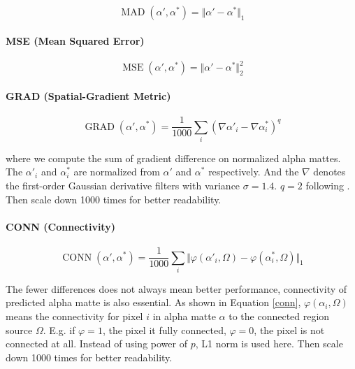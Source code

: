 \documentclass[final]{cvpr}
\begin{document}
\begin{equation}\label{mad}
    \operatorname{MAD}(\alpha', \alpha^*)=\Vert\alpha'-\alpha^*\Vert_1
\end{equation}

\paragraph{MSE (Mean Squared Error)}

\begin{equation}\label{mse}
    \operatorname{MSE}(\alpha', \alpha^*)=\Vert\alpha'-\alpha^*\Vert_2^2
\end{equation}

\paragraph{GRAD (Spatial-Gradient Metric)}

\begin{equation}\label{grad}
    \operatorname{GRAD}(\alpha', \alpha^*)=\frac{1}{1000}\sum_i(\nabla \alpha'_i-\nabla \alpha^*_i)^q
\end{equation}

where we compute the sum of gradient difference on normalized alpha mattes.
The $\alpha'_i$ and $\alpha^*_i$ are normalized from $\alpha'$ and $\alpha^*$ respectively.
And the $\nabla$ denotes the first-order Gaussian derivative filters with variance $\sigma=1.4$. $q=2$ following \cite{linRealTimeHighResolutionBackground2020a}.
Then scale down 1000 times for better readability.

\paragraph{CONN (Connectivity)}

\begin{equation}\label{conn}
    \operatorname{CONN}(\alpha', \alpha^*)=\frac{1}{1000}\sum_i\Vert\varphi(\alpha'_i,\Omega)-\varphi(\alpha^*_i,\Omega)\Vert_1
\end{equation}

The fewer differences does not always mean better performance, connectivity of predicted alpha matte is also essential.
As shown in Equation \ref{conn}, $\varphi(\alpha_i,\Omega)$ means the connectivity for pixel $i$ in alpha matte $\alpha$ to the connected region source $\Omega$.
E.g. if $\varphi=1$, the pixel it fully connected, $\varphi=0$, the pixel is not connected at all. Instead of using power of $p$, L1 norm is used here.
Then scale down 1000 times for better readability.
\end{document}
